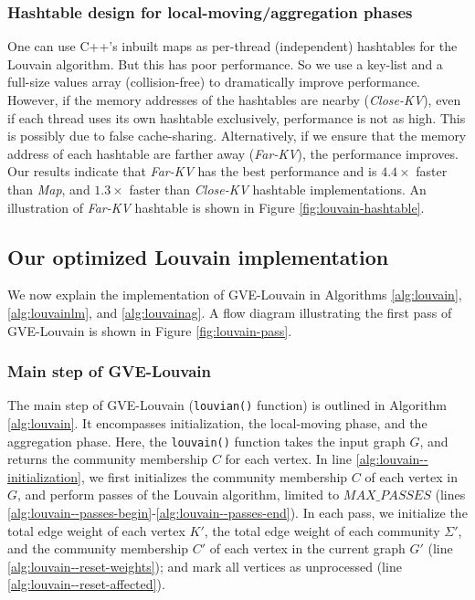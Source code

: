 \subsubsection{Hashtable design for local-moving/aggregation phases}

One can use C++'s inbuilt maps as per-thread (independent) hashtables for the Louvain algorithm. But this has poor performance. So we use a key-list and a full-size values array (collision-free) to dramatically improve performance. However, if the memory addresses of the hashtables are nearby (\textit{Close-KV}), even if each thread uses its own hashtable exclusively, performance is not as high. This is possibly due to false cache-sharing. Alternatively, if we ensure that the memory address of each hashtable are farther away (\textit{Far-KV}), the performance improves. Our results indicate that \textit{Far-KV} has the best performance and is $4.4\times$ faster than \textit{Map}, and $1.3\times$ faster than \textit{Close-KV} hashtable implementations. An illustration of \textit{Far-KV} hashtable is shown in Figure \ref{fig:louvain-hashtable}.







\subsection{Our optimized Louvain implementation}

We now explain the implementation of GVE-Louvain in Algorithms \ref{alg:louvain}, \ref{alg:louvainlm}, and \ref{alg:louvainag}. A flow diagram illustrating the first pass of GVE-Louvain is shown in Figure \ref{fig:louvain-pass}.


\subsubsection{Main step of GVE-Louvain}

The main step of GVE-Louvain (\texttt{louvian()} function) is outlined in Algorithm \ref{alg:louvain}. It encompasses initialization, the local-moving phase, and the aggregation phase. Here, the \texttt{louvain()} function takes the input graph $G$, and returns the community membership $C$ for each vertex. In line \ref{alg:louvain--initialization}, we first initializes the community membership $C$ of each vertex in $G$, and perform passes of the Louvain algorithm, limited to $MAX\_PASSES$ (lines \ref{alg:louvain--passes-begin}-\ref{alg:louvain--passes-end}). In each pass, we initialize the total edge weight of each vertex $K'$, the total edge weight of each community $\Sigma'$, and the community membership $C'$ of each vertex in the current graph $G'$ (line \ref{alg:louvain--reset-weights}); and mark all vertices as unprocessed (line \ref{alg:louvain--reset-affected}).

